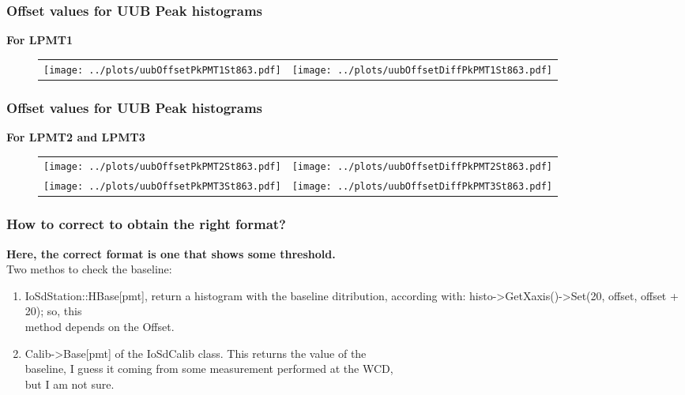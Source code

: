 \documentclass[aspectratio=169]{beamer}
\begin{document}

\begin{frame}
	\frametitle{Offset values for UUB Peak histograms}
	{\bf For LPMT1}
	\begin{figure}
		\centering
		\begin{tabularx}{\textwidth}{CC}
			\texttt{[image: ../plots/uubOffsetPkPMT1St863.pdf]}
			&
			\texttt{[image: ../plots/uubOffsetDiffPkPMT1St863.pdf]}
		\end{tabularx}
	\end{figure}
\end{frame}
			
			
\begin{frame}
	\frametitle{Offset values for UUB Peak histograms}
	{\bf For LPMT2 and LPMT3}
	\begin{figure}
		\centering
		\begin{tabularx}{\textwidth}{CC}
			\texttt{[image: ../plots/uubOffsetPkPMT2St863.pdf]}
			&
			\texttt{[image: ../plots/uubOffsetDiffPkPMT2St863.pdf]}
			\\
			\texttt{[image: ../plots/uubOffsetPkPMT3St863.pdf]}
			&
			\texttt{[image: ../plots/uubOffsetDiffPkPMT3St863.pdf]}
		\end{tabularx}
	\end{figure}
\end{frame}


\begin{frame}
	\frametitle{How to correct to obtain the right format?}
	{\bf Here, the correct format is one that shows some threshold.\\}
	\vspace{0.75cm}
	Two methos to check the baseline:
	\vspace{0.5cm}
	\begin{enumerate}
		\item IoSdStation::HBase[pmt], return a histogram with the baseline ditribution,
			according with: histo->GetXaxis()->Set(20, offset, offset + 20); so, this \\
			method depends on the Offset.
		\item Calib->Base[pmt] of the IoSdCalib class. This returns the value of the \\
			baseline, I guess it coming from some measurement performed at the WCD, \\
			but I am not sure.
	\end{enumerate}
\end{frame}
\end{document}
